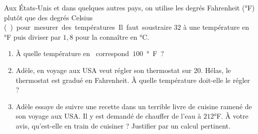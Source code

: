 
\begin{exercice}\label{exosmath-0821}


Aux États-Unis et dans quelques autres pays, on utilise les degrés Fahrenheit (°F) plutôt que des degrés Celsius (\si\degreecelsius) pour mesurer des températures. Il faut soustraire $32$ à une température en °F puis diviser par $1,8$ pour la connaître en °C.  

\begin{enumerate}
    \item
        À quelle température en \si\degreecelsius correspond \( 100 \) °F ?
    \item
        Adèle, en voyage aux USA veut régler son thermostat sur \SI{20}{\degreecelsius}. Hélas, le thermostat est gradué en Fahrenheit. À quelle température doit-elle le régler ?
    \item
        Adèle essaye de suivre une recette dans un terrible livre de cuisine ramené de son voyage aux USA. Il y est demandé de chauffer de l'eau à \( 212\)°F. À votre avis, qu'est-elle en train de cuisiner ? Justifier par un calcul pertinent.
\end{enumerate}

\end{exercice}
